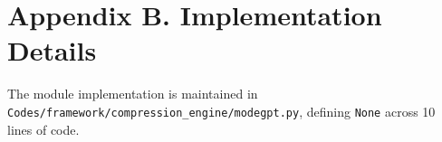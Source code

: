 \section*{Appendix B. Implementation Details}
The module implementation is maintained in \texttt{Codes/framework/compression\_engine/modegpt.py}, defining \texttt{None} across 10 lines of code.
